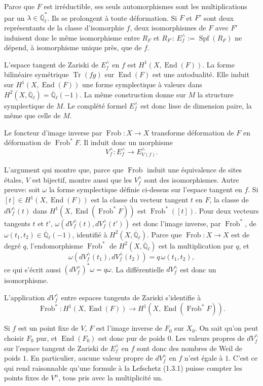 \documentclass[11pt,a4paper]{article}
\theoremstyle{plain}
\theoremstyle{definition}
\DeclareMathOperator{\Specf}{Spf}
\DeclareMathOperator{\End}{End}
\DeclareMathOperator{\Frob}{Frob}
\DeclareMathOperator{\Tr}{Tr}
\newcommand{\Ql}{\overline{\mathbb{Q}}_\ell}
\begin{document}
Parce que $F$ est irr\'eductible, ses seuls automorphismes sont les multiplications par un $\lambda \in \Ql^*$. Ils se prolongent \`a toute d\'eformation. Si $F$ et $F'$ sont deux repr\'esentants de la classe d'isomorphie $f$, deux isomorphismes de $F$ avec $F'$ induisent donc le m\^eme isomorphisme entre $R_F$ et $R_{F'}$: $E^\wedge_f := \Specf(R_F)$ ne d\'epend, \`a isomorphisme unique pr\`es, que de $f$.

L'espace tangent de Zariski de $E^\wedge_f$ en $f$ est $H^1(X, \End(F))$. La forme bilin\'eaire sym\'etrique $\Tr(fg)$ sur $\End(F)$ est une autodualit\'e. Elle induit sur $H^1(X, \End(F))$ une forme symplectique \`a valeurs dans $H^2(X, \Ql) = \Ql(-1)$. La m\^eme construction donne sur $M$ la structure symplectique de $M$. Le compl\'et\'e formel $E^\wedge_f$ est donc lisse de dimension paire, la m\^eme que celle de $M$.

Le foncteur d'image inverse par $\Frob: X \to X$ transforme d\'eformation de $F$ en d\'eformation de $\Frob^*F$. Il induit donc un morphisme
\[
V^\wedge_f: E^\wedge_f \longrightarrow E^\wedge_{V(f)}.
\]

L'argument qui montre que, parce que $\Frob$ induit une \'equivalence de sites \'etales, $V$ est bijectif, montre aussi que les $V^\wedge_f$ sont des isomorphismes. Autre preuve: soit $\omega$ la forme symplectique d\'efinie ci-dessus sur l'espace tangent en $f$. Si $[t] \in H^1(X, \End(F))$ est la classe du vecteur tangent $t$ en $F$, la classe de $dV^\wedge_f(t)$ dans $H^1(X, \End(\Frob^*F))$ est $\Frob^*([t])$. Pour deux vecteurs tangents $t$ et $t'$, $\omega(dV^\wedge_f(t), dV^\wedge_f(t'))$ est donc l'image inverse, par $\Frob^*$, de $\omega(t_1, t_2) \in \Ql(-1)$, identifi\'e \`a $H^2(X, \Ql)$. Parce que $\Frob: X \to X$ est de degr\'e $q$, l'endomorphisme $\Frob^*$ de $H^2(X, \Ql)$ est la multiplication par $q$, et
\[
\omega(dV^\wedge_f(t_1), dV^\wedge_f(t_2)) = q\,\omega(t_1, t_2),
\]
ce qui s'\'ecrit aussi $(dV^\wedge_f)^*\omega = q\omega$. La diff\'erentielle $dV^\wedge_f$ est donc un isomorphisme.

L'application $dV^\wedge_f$ entre espaces tangents de Zariski s'identifie \`a
\[
\Frob^*: H^1(X, \End(F)) \longrightarrow H^1(X, \End(\Frob^*F)).
\]

Si $f$ est un point fixe de $V$, $F$ est l'image inverse de $F_0$ sur $X_0$. On sait qu'on peut choisir $F_0$ pur, et $\End(F_0)$ est donc pur de poids $0$. Les valeurs propres de $dV^\wedge_f$ sur l'espace tangent de Zariski de $E^\wedge_f$ en $f$ sont donc des nombres de Weil de poids $1$. En particulier, aucune valeur propre de $dV^\wedge_f$ en $f$ n'est \'egale \`a $1$. C'est ce qui rend raisonnable qu'une formule \`a la Lefschetz (1.3.1) puisse compter les points fixes de $V^n$, tous pris avec la multiplicit\'e un.
\end{document}
